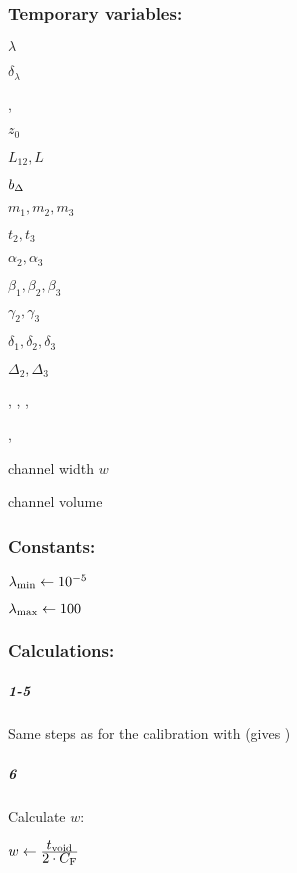 \subsubsection*{Temporary variables:}
\begin{multicols}{3}
  \begin{packed_item}
    \item {}
    \item $λ$
    \item $δ_λ$
    \item \Rmeas, \Rcalc
    \item $z_0$
    \item $L_{12}, L$
    \item $b_\Delta$
    \item $m_1, m_2, m_3$
    \item $t_2, t_3$
    \item $α_2, α_3$
    \item $β_1, β_2, β_3$
    \item $γ_2, γ_3$
    \item $δ_1, δ_2, δ_3$
    \item $Δ_2, Δ_3$
    \item \CFone, \CFtwo, \CFthree, \CF
    \item {}, 
    \item channel width $w$
    \item channel volume \Vhyd    
  \end{packed_item}
\end{multicols}

\subsubsection*{Constants:}
\begin{multicols}{3}
  \begin{packed_item}
    \item $\lambda_\text{min} \leftarrow 10^{-5}$
    \item $\lambda_\text{max} \leftarrow 100$ 
  \end{packed_item}
\end{multicols}
\subsubsection*{Calculations:}

\subparagraph{1-5} Same steps as for the calibration with \Vhyd (gives \CF)

\subparagraph{6}
Calculate $w$:
\begin{algorithmic}
  \State $w \leftarrow \frac{\displaystyle t_\text{void}}{\displaystyle 2\cdot C_\text{F}} $
\end{algorithmic}

